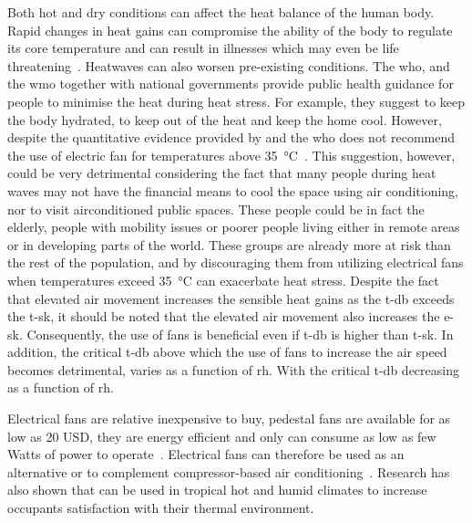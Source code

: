 Both hot and dry conditions can affect the heat balance of the human body.
Rapid changes in heat gains can compromise the ability of the body to regulate its core temperature and can result in illnesses which may even be life threatening~\cite{WMO2015}.
Heatwaves can also worsen pre-existing conditions.
The \ac{who}, and the \ac{wmo} together with national governments provide public health guidance for people to minimise the heat during heat stress.
For example, they suggest to keep the body hydrated, to keep out of the heat and keep the home cool.
However, despite the quantitative evidence provided by  and  the \ac{who} does not recommend the use of electric fan for temperatures above 35~°C~\cite{HeatandH28:online, WMO2015}.
This suggestion, however, could be very detrimental considering the fact that many people during heat waves may not have the financial means to cool the space using air conditioning, nor to visit airconditioned public spaces.
These people could be in fact the elderly, people with mobility issues or poorer people living either in remote areas or in developing parts of the world.
These groups are already more at risk than the rest of the population, and by discouraging them from utilizing electrical fans when temperatures exceed 35~°C can exacerbate heat stress.
Despite the fact that elevated air movement increases the sensible heat gains as the \ac{t-db} exceeds the \ac{t-sk}, it should be noted that the elevated air movement also increases the \ac{e-sk}.
Consequently, the use of fans is beneficial even if \ac{t-db} is higher than \ac{t-sk}.
In addition, the critical \ac{t-db} above which the use of fans to increase the air speed becomes detrimental, varies as a function of \ac{rh}.
With the critical \ac{t-db} decreasing as a function of \ac{rh}.

Electrical fans are relative inexpensive to buy, pedestal fans are available for as low as 20 USD, they are energy efficient and only can consume as low as few Watts of power to operate~\cite{Yang2015a, Lipczynska2018a, Jay2019a}.
Electrical fans can therefore be used as an alternative or to complement compressor-based air conditioning~\cite{Yang2015a, Lipczynska2018a, Jay2019a}.
Research has also shown that can be used in tropical hot and humid climates to increase occupants satisfaction with their thermal environment.

